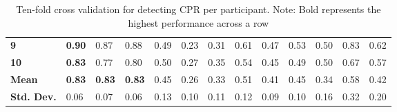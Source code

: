 \begin{table}[h]
\begin{tabular}{lllllllllllll}
		\textbf{9}   & \textbf{0.90} & 0.87 & 0.88 & 0.49 & 0.23 & 0.31 & 0.61 & 0.47 & 0.53 & 0.50 & 0.83 & 0.62 \\
		\textbf{10} & \textbf{0.83} & 0.77 & 0.80 & 0.50 & 0.27 & 0.35 & 0.54 & 0.45 & 0.49 & 0.50 & 0.67 & 0.57 \\
		\hline
		\textbf{Mean} & \textbf{0.83} & \textbf{0.83} & \textbf{0.83} & 0.45 & 0.26 & 0.33 & 0.51 & 0.41 & 0.45 & 0.34 & 0.58 & 0.42 \\
		\textbf{Std. Dev.} & 0.06 & 0.07 & 0.06 & 0.13 & 0.10 & 0.11 & 0.12 & 0.09 & 0.10 & 0.16 & 0.32 & 0.20
	\end{tabular}
	\caption{Ten-fold cross validation for detecting CPR per participant. Note: Bold represents the highest performance across a row}
	\label{tab:cpr:ml}
\end{table}

